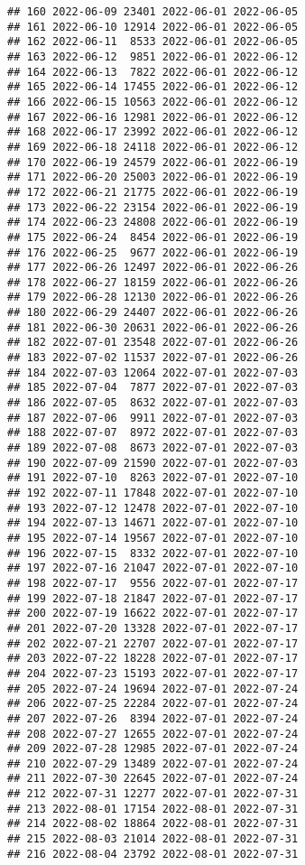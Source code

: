 \documentclass[
]{article}
\begin{document}
\begin{verbatim}
## 160 2022-06-09 23401 2022-06-01 2022-06-05
## 161 2022-06-10 12914 2022-06-01 2022-06-05
## 162 2022-06-11  8533 2022-06-01 2022-06-05
## 163 2022-06-12  9851 2022-06-01 2022-06-12
## 164 2022-06-13  7822 2022-06-01 2022-06-12
## 165 2022-06-14 17455 2022-06-01 2022-06-12
## 166 2022-06-15 10563 2022-06-01 2022-06-12
## 167 2022-06-16 12981 2022-06-01 2022-06-12
## 168 2022-06-17 23992 2022-06-01 2022-06-12
## 169 2022-06-18 24118 2022-06-01 2022-06-12
## 170 2022-06-19 24579 2022-06-01 2022-06-19
## 171 2022-06-20 25003 2022-06-01 2022-06-19
## 172 2022-06-21 21775 2022-06-01 2022-06-19
## 173 2022-06-22 23154 2022-06-01 2022-06-19
## 174 2022-06-23 24808 2022-06-01 2022-06-19
## 175 2022-06-24  8454 2022-06-01 2022-06-19
## 176 2022-06-25  9677 2022-06-01 2022-06-19
## 177 2022-06-26 12497 2022-06-01 2022-06-26
## 178 2022-06-27 18159 2022-06-01 2022-06-26
## 179 2022-06-28 12130 2022-06-01 2022-06-26
## 180 2022-06-29 24407 2022-06-01 2022-06-26
## 181 2022-06-30 20631 2022-06-01 2022-06-26
## 182 2022-07-01 23548 2022-07-01 2022-06-26
## 183 2022-07-02 11537 2022-07-01 2022-06-26
## 184 2022-07-03 12064 2022-07-01 2022-07-03
## 185 2022-07-04  7877 2022-07-01 2022-07-03
## 186 2022-07-05  8632 2022-07-01 2022-07-03
## 187 2022-07-06  9911 2022-07-01 2022-07-03
## 188 2022-07-07  8972 2022-07-01 2022-07-03
## 189 2022-07-08  8673 2022-07-01 2022-07-03
## 190 2022-07-09 21590 2022-07-01 2022-07-03
## 191 2022-07-10  8263 2022-07-01 2022-07-10
## 192 2022-07-11 17848 2022-07-01 2022-07-10
## 193 2022-07-12 12478 2022-07-01 2022-07-10
## 194 2022-07-13 14671 2022-07-01 2022-07-10
## 195 2022-07-14 19567 2022-07-01 2022-07-10
## 196 2022-07-15  8332 2022-07-01 2022-07-10
## 197 2022-07-16 21047 2022-07-01 2022-07-10
## 198 2022-07-17  9556 2022-07-01 2022-07-17
## 199 2022-07-18 21847 2022-07-01 2022-07-17
## 200 2022-07-19 16622 2022-07-01 2022-07-17
## 201 2022-07-20 13328 2022-07-01 2022-07-17
## 202 2022-07-21 22707 2022-07-01 2022-07-17
## 203 2022-07-22 18228 2022-07-01 2022-07-17
## 204 2022-07-23 15193 2022-07-01 2022-07-17
## 205 2022-07-24 19694 2022-07-01 2022-07-24
## 206 2022-07-25 22284 2022-07-01 2022-07-24
## 207 2022-07-26  8394 2022-07-01 2022-07-24
## 208 2022-07-27 12655 2022-07-01 2022-07-24
## 209 2022-07-28 12985 2022-07-01 2022-07-24
## 210 2022-07-29 13489 2022-07-01 2022-07-24
## 211 2022-07-30 22645 2022-07-01 2022-07-24
## 212 2022-07-31 12277 2022-07-01 2022-07-31
## 213 2022-08-01 17154 2022-08-01 2022-07-31
## 214 2022-08-02 18864 2022-08-01 2022-07-31
## 215 2022-08-03 21014 2022-08-01 2022-07-31
## 216 2022-08-04 23792 2022-08-01 2022-07-31

\end{verbatim}
\end{document}

